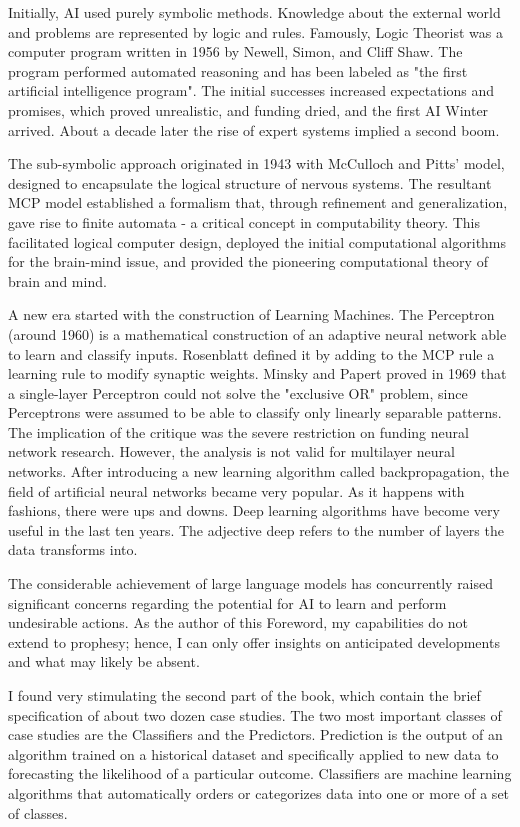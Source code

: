 Initially, AI used purely symbolic methods. Knowledge about the external world and problems are represented by logic and rules. Famously, Logic Theorist was a computer program written in 1956 by Newell, Simon, and Cliff Shaw. The program performed automated reasoning and has been labeled as "the first artificial intelligence program". The initial successes increased expectations and promises, which proved unrealistic, and funding dried, and the first AI Winter arrived. About a decade later the rise of expert systems implied a second boom.

The sub-symbolic approach originated in 1943 with McCulloch and Pitts' model, designed to encapsulate the logical structure of nervous systems. The resultant MCP model established a formalism that, through refinement and generalization, gave rise to finite automata - a critical concept in computability theory. This facilitated logical computer design, deployed the initial computational algorithms for the brain-mind issue, and provided the pioneering computational theory of brain and mind.

A new era started with the construction of Learning Machines. The Perceptron (around 1960) is a mathematical construction of an adaptive neural network able to learn and classify inputs. Rosenblatt defined it by adding to the MCP rule a learning rule to modify synaptic weights. Minsky and Papert proved in 1969 that a single-layer Perceptron could not solve the "exclusive OR" problem, since Perceptrons were assumed to be able to classify only linearly separable patterns. The implication of the critique was the severe restriction on funding neural network research. However, the analysis is not valid for multilayer neural networks. After introducing a new learning algorithm called backpropagation, the field of artificial neural networks became very popular. As it happens with fashions, there were ups and downs. Deep learning algorithms have become very useful in the last ten years. The adjective deep refers to the number of layers the data transforms into. 

The considerable achievement of large language models has concurrently raised significant concerns regarding the potential for AI to learn and perform undesirable actions. As the author of this Foreword, my capabilities do not extend to prophesy; hence, I can only offer insights on anticipated developments and what may likely be absent.

I found very stimulating the second part of the book, which contain the brief specification of about two dozen case studies. The two most important classes of case studies are the Classifiers and the Predictors. Prediction is the output of an algorithm trained on a historical dataset and specifically applied to new data to  forecasting the likelihood of a particular outcome. Classifiers are machine learning algorithms that automatically orders or categorizes data into one or more of a set of classes.


